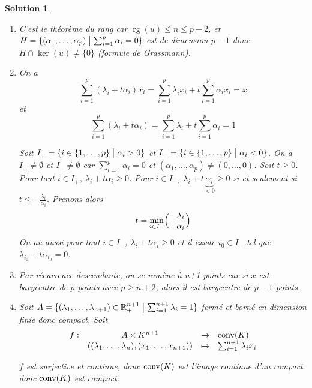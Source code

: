 \documentclass[12pt]{article}
\newtheorem{solution}{Solution}[section]
\theoremstyle{remark}
\DeclareMathOperator{\rg}{rg} \DeclareMathOperator{\Tr}{Tr}
\newcommand{\function}[5]{
	$$
	\begin{array}{rccl}
		#1: & #2 & \to & #3 \\
		& #4 & \mapsto & #5
	\end{array}
	$$
}
\numberwithin{equation}{section}
\begin{document}
\begin{solution}
	\phantom{}
	\begin{enumerate}
		\item C'est le théorème du rang car $\rg(u)\leqslant n\leqslant p-2$, et $H=\{(\alpha_{1},\dots,\alpha_{p})\bigm|\sum_{i=1}^{p}\alpha_{i}=0\}$ est de dimension $p-1$ donc $H\cap\ker(u)\neq\{0\}$ (formule de Grassmann).
		
		\item On a 
		$$\sum_{i=1}^{p}(\lambda_{i}+t\alpha_{i})x_{i}=\sum_{i=1}^{p}\lambda_{i}x_{i}+t\sum_{i=1}^{p}\alpha_{i}x_{i}=x$$
		et
		$$\sum_{i=1}^{p}(\lambda_{i}+t\alpha_{i})=\sum_{i=1}^{p}\lambda_{i}+t\sum_{i=1}^{p}\alpha_{i}=1$$

		Soit $I_{+}=\{i\in\{1,\dots,p\}\bigm|\alpha_{i}>0\}$ et $I_{-}=\{i\in\{1,\dots,p\}\bigm|\alpha_{i}<0\}$. On a $I_{+}\neq\emptyset$ et $I_{-}\neq\emptyset$ car $\sum_{i=1}^{p}\alpha_{i}=0$ et $(\alpha_{1},\dots,\alpha_{p})\neq(0,\dots,0)$. Soit $t\geqslant0$. Pour tout $i\in I_{+}$, $\lambda_{i}+t\alpha_{i}\geqslant0$. Pour $i\in I_{-}$, $\lambda_{i}+t\underbrace{\alpha_{i}}_{<0}\geqslant 0$ si et seulement si $t\leqslant-\frac{\lambda_{i}}{\alpha_{i}}$. Prenons alors 
		$$t=\min\limits_{i\in I_{-}}\Bigl(-\frac{\lambda_{i}}{\alpha_{i}}\Bigr)$$
		On au aussi pour tout $i\in I_{-}$, $\lambda_{i}+t\alpha_{i}\geqslant 0$ et il existe $i_{0}\in I_{-}$ tel que $\lambda_{i_{0}}+t\alpha_{i_{0}}=0$.

		\item Par récurrence descendante, on se ramène à n+1 points car si $x$ est barycentre de $p$ points avec $p\geqslant n+2$, alors il est barycentre de $p-1$ points.
		
		\item Soit $A=\{(\lambda_{1},\dots,\lambda_{n+1})\in\mathbb{R}_{+}^{n+1}\bigm|\sum_{i=1}^{n+1}\lambda_{i}=1\}$ fermé et borné en dimension finie donc compact. Soit \function{f}{A\times K^{n+1}}{\conv(K)}{((\lambda_{1},\dots,\lambda_{n}),(x_{1},\dots,x_{n+1}))}{\sum_{i=1}^{n+1}\lambda_{i}x_{i}}
		$f$ est surjective et continue, donc $\operatorname{conv}(K)$ est l'image continue d'un compact donc $\operatorname{conv}(K)$ est compact.
	\end{enumerate}
\end{solution}
\end{document}
